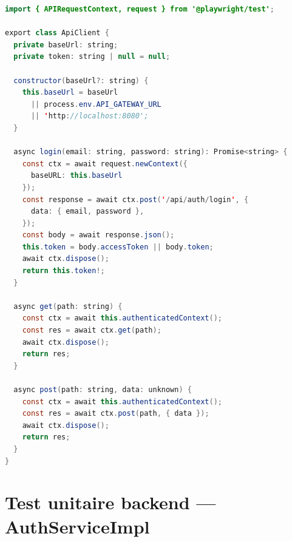 \begin{lstlisting}[language=Java, caption={api-client.ts --- Client HTTP authentifié}, label={lst:api-client}]
import { APIRequestContext, request } from '@playwright/test';

export class ApiClient {
  private baseUrl: string;
  private token: string | null = null;

  constructor(baseUrl?: string) {
    this.baseUrl = baseUrl
      || process.env.API_GATEWAY_URL
      || 'http://localhost:8080';
  }

  async login(email: string, password: string): Promise<string> {
    const ctx = await request.newContext({
      baseURL: this.baseUrl
    });
    const response = await ctx.post('/api/auth/login', {
      data: { email, password },
    });
    const body = await response.json();
    this.token = body.accessToken || body.token;
    await ctx.dispose();
    return this.token!;
  }

  async get(path: string) {
    const ctx = await this.authenticatedContext();
    const res = await ctx.get(path);
    await ctx.dispose();
    return res;
  }

  async post(path: string, data: unknown) {
    const ctx = await this.authenticatedContext();
    const res = await ctx.post(path, { data });
    await ctx.dispose();
    return res;
  }
}
\end{lstlisting}

\section{Test unitaire backend --- AuthServiceImpl}

